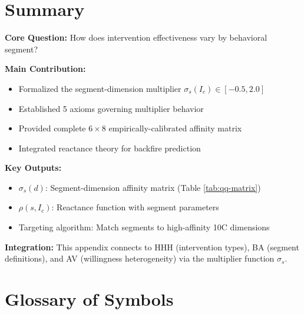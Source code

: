 
\section{Summary}
\label{sec:qq-summary}

\begin{tcolorbox}[colback=green!10!white, colframe=green!75!black,
    title=\textbf{Appendix UNMAPPED_QQ: Summary}]

\textbf{Core Question:} How does intervention effectiveness vary by behavioral segment?

\textbf{Main Contribution:}
\begin{itemize}[nosep]
    \item Formalized the segment-dimension multiplier $\sigma_s(I_c) \in [-0.5, 2.0]$
    \item Established 5 axioms governing multiplier behavior
    \item Provided complete $6 \times 8$ empirically-calibrated affinity matrix
    \item Integrated reactance theory for backfire prediction
\end{itemize}

\textbf{Key Outputs:}
\begin{itemize}[nosep]
    \item $\sigma_s(d)$: Segment-dimension affinity matrix (Table \ref{tab:qq-matrix})
    \item $\rho(s, I_c)$: Reactance function with segment parameters
    \item Targeting algorithm: Match segments to high-affinity 10C dimensions
\end{itemize}

\textbf{Integration:} This appendix connects to HHH (intervention types),
BA (segment definitions), and AV (willingness heterogeneity) via the
multiplier function $\sigma_s$.

\end{tcolorbox}


\section{Glossary of Symbols}
\label{sec:qq-glossary}

